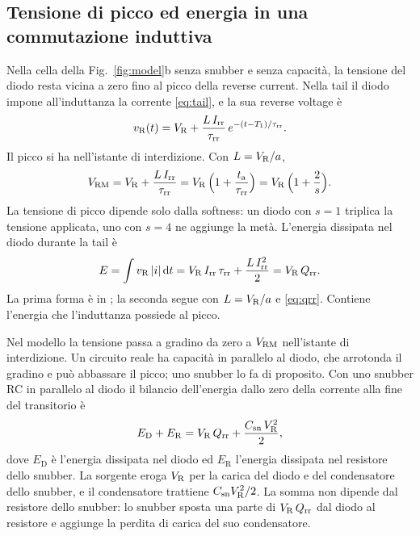\documentclass[10pt,a4paper]{scrartcl}
\let\newcommand\lmitdefine
\newcommand{\VR}{V_\mathrm{R}}
\newcommand{\Irr}{I_\mathrm{rr}}
\newcommand{\Qrr}{Q_\mathrm{rr}}
\newcommand{\ta}{t_\mathrm{a}}
\newcommand{\taurr}{\tau_\mathrm{rr}}
\newcommand{\Tone}{T_1}
\newcommand{\Csn}{C_\mathrm{sn}}
\newcommand{\Vrm}{V_\mathrm{RM}}
\newcommand{\diff}{\mathrm{d}}
\begin{document}
\subsection{Tensione di picco ed energia in una commutazione induttiva}
\label{sec:energy}
Nella cella della Fig.~\ref{fig:model}b senza snubber e senza capacità, la tensione del diodo resta vicina a zero fino al picco della reverse current. Nella tail il diodo impone all'induttanza la corrente \eqref{eq:tail}, e la sua reverse voltage è
\begin{equation}
v_\mathrm{R}(t) = \VR + \frac{L\,\Irr}{\taurr}\,e^{-(t-\Tone)/\taurr} .
\end{equation}
Il picco si ha nell'istante di interdizione. Con $L = \VR/a$,
\begin{equation}
\Vrm = \VR + \frac{L\,\Irr}{\taurr} = \VR\,\Bigl(1 + \frac{\ta}{\taurr}\Bigr) = \VR\,\Bigl(1 + \frac{2}{s}\Bigr) .
\label{eq:vrm}
\end{equation}
La tensione di picco dipende solo dalla softness: un diodo con $s = 1$ triplica la tensione applicata, uno con $s = 4$ ne aggiunge la metà. L'energia dissipata nel diodo durante la tail è
\begin{equation}
E = \int v_\mathrm{R}\,|i|\,\diff t = \VR\,\Irr\,\taurr + \frac{L\,\Irr^2}{2} = \VR\,\Qrr .
\label{eq:erec}
\end{equation}
La prima forma è in \cite{mathworks}; la seconda segue con $L = \VR/a$ e \eqref{eq:qrr}. Contiene l'energia che l'induttanza possiede al picco.

Nel modello la tensione passa a gradino da zero a $\Vrm$ nell'istante di interdizione. Un circuito reale ha capacità in parallelo al diodo, che arrotonda il gradino e può abbassare il picco; uno snubber lo fa di proposito. Con uno snubber RC in parallelo al diodo il bilancio dell'energia dallo zero della corrente alla fine del transitorio è
\begin{equation}
E_\mathrm{D} + E_\mathrm{R} = \VR\,\Qrr + \frac{\Csn\,\VR^2}{2} ,
\label{eq:ebal}
\end{equation}
dove $E_\mathrm{D}$ è l'energia dissipata nel diodo ed $E_\mathrm{R}$ l'energia dissipata nel resistore dello snubber. La sorgente eroga $\VR$ per la carica del diodo e del condensatore dello snubber, e il condensatore trattiene $\Csn\VR^2/2$. La somma non dipende dal resistore dello snubber: lo snubber sposta una parte di $\VR\,\Qrr$ dal diodo al resistore e aggiunge la perdita di carica del suo condensatore.
\end{document}
